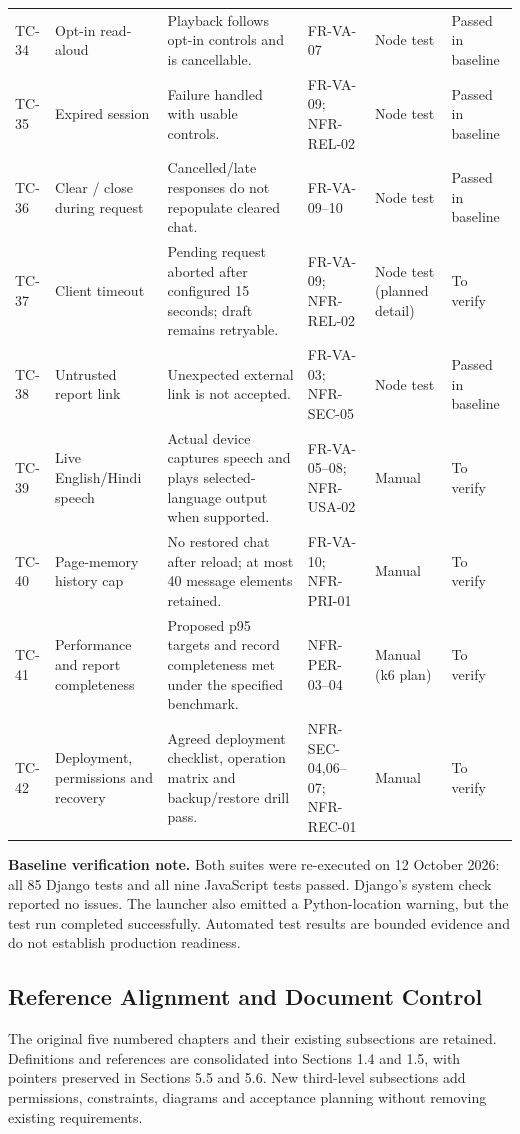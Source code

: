 \documentclass[11pt,a4paper]{article}
\newcommand{\BaselineDate}{12 October 2026}
\begin{document}
\begin{longtable}{@{}L{9mm}L{26mm}L{41mm}L{29mm}L{20mm}L{21mm}@{}}
TC-34 & Opt-in read-aloud & Playback follows opt-in controls and is cancellable. & FR-VA-07 & Node test & Passed in baseline\\
TC-35 & Expired session & Failure handled with usable controls. & FR-VA-09; NFR-REL-02 & Node test & Passed in baseline\\
TC-36 & Clear / close during request & Cancelled/late responses do not repopulate cleared chat. & FR-VA-09--10 & Node test & Passed in baseline\\
TC-37 & Client timeout & Pending request aborted after configured 15 seconds; draft remains retryable. & FR-VA-09; NFR-REL-02 & Node test (planned detail) & To verify\\
TC-38 & Untrusted report link & Unexpected external link is not accepted. & FR-VA-03; NFR-SEC-05 & Node test & Passed in baseline\\
TC-39 & Live English/Hindi speech & Actual device captures speech and plays selected-language output when supported. & FR-VA-05--08; NFR-USA-02 & Manual & To verify\\
TC-40 & Page-memory history cap & No restored chat after reload; at most 40 message elements retained. & FR-VA-10; NFR-PRI-01 & Manual & To verify\\
TC-41 & Performance and report completeness & Proposed p95 targets and record completeness met under the specified benchmark. & NFR-PER-03--04 & Manual (k6 plan) & To verify\\
TC-42 & Deployment, permissions and recovery & Agreed deployment checklist, operation matrix and backup/restore drill pass. & NFR-SEC-04,06--07; NFR-REC-01 & Manual & To verify\\
\end{longtable}\endgroup

\textbf{Baseline verification note.} Both suites were re-executed on \BaselineDate: all 85 Django tests and all nine JavaScript tests passed. Django's system check reported no issues. The launcher also emitted a Python-location warning, but the test run completed successfully. Automated test results are bounded evidence and do not establish production readiness.

\subsection{Reference Alignment and Document Control}
The original five numbered chapters and their existing subsections are retained. Definitions and references are consolidated into Sections 1.4 and 1.5, with pointers preserved in Sections 5.5 and 5.6. New third-level subsections add permissions, constraints, diagrams and acceptance planning without removing existing requirements.
\end{document}
